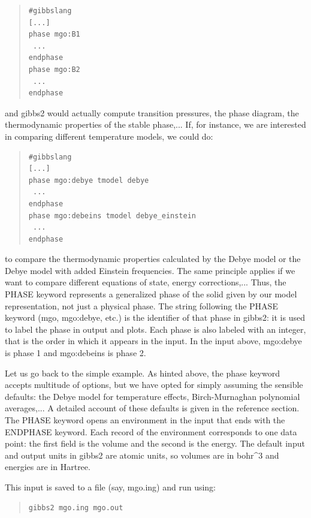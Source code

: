 \documentclass[a4paper]{article}
\begin{document}
\begin{quote}
\begin{verbatim}
#gibbslang
[...]
phase mgo:B1
 ...
endphase
phase mgo:B2
 ...
endphase
\end{verbatim}
\end{quote}

and gibbs2 would actually compute transition pressures, the phase
diagram, the thermodynamic properties of the stable phase,... If, for
instance, we are interested in comparing different temperature models,
we could do:

\begin{quote}
\begin{verbatim}
#gibbslang
[...]
phase mgo:debye tmodel debye
 ...
endphase
phase mgo:debeins tmodel debye_einstein
 ...
endphase
\end{verbatim}
\end{quote}

to compare the thermodynamic properties calculated by the Debye model
or the Debye model with added Einstein frequencies. The same principle
applies if we want to compare different equations of state, energy
corrections,... Thus, the PHASE keyword represents a generalized
phase of the solid given by our model representation, not just a
physical phase. The string following the PHASE keyword (mgo,
mgo:debye, etc.) is the identifier of that phase in gibbs2: it is used
to label the phase in output and plots. Each phase is also labeled
with an integer, that is the order in which it appears in the
input. In the input above, mgo:debye is phase 1 and
mgo:debeins is phase 2.

Let us go back to the simple example. As hinted above, the phase
keyword accepts multitude of options, but we have opted for simply
assuming the sensible defaults: the Debye model for temperature
effects, Birch-Murnaghan polynomial averages,... A detailed account of
these defaults is given in the reference section. The PHASE keyword
opens an environment in the input that ends with the ENDPHASE
keyword. Each record of the environment corresponds to one data point:
the first field is the volume and the second is the energy. The
default input and output units in gibbs2 are atomic units, so volumes
are in bohr\textasciicircum{}3 and energies are in Hartree.

This input is saved to a file (say, mgo.ing) and run using:

\begin{quote}
\begin{verbatim}
gibbs2 mgo.ing mgo.out
\end{verbatim}
\end{quote}
\end{document}
